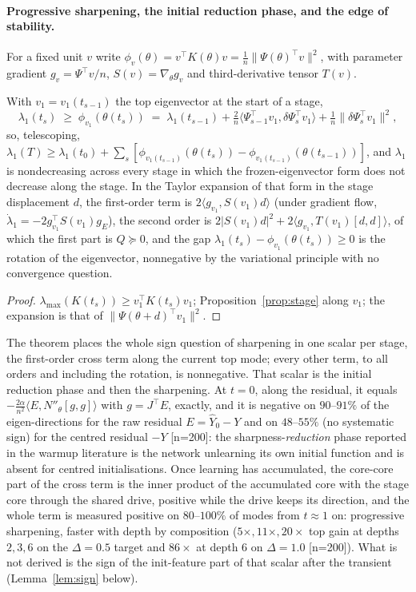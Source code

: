 \paragraph{Progressive sharpening, the initial reduction phase, and the edge of stability.}
For a fixed unit $v$ write $\phi_v(\theta)=v^{\!\top}K(\theta)v=\frac1n\|\Psi(\theta)^{\!\top}v\|^2$,
with parameter gradient $g_v=\Psi^{\!\top}v/n$, $S(v)=\nabla_\theta g_v$ and
third-derivative tensor $T(v)$.
\begin{theorem}
\label{thm:sharpening}
With $v_1=v_1(t_{s-1})$ the top eigenvector at the start of a stage,
\[
\lambda_1(t_s)\;\ge\;\phi_{v_1}(\theta(t_s))\;=\;\lambda_1(t_{s-1})+\tfrac2n\langle\Psi_{s-1}^{\!\top}v_1,\delta\Psi_s^{\!\top}v_1\rangle+\tfrac1n\|\delta\Psi_s^{\!\top}v_1\|^2 ,
\]
so, telescoping, $\lambda_1(T)\ge\lambda_1(t_0)+\sum_s[\phi_{v_1(t_{s-1})}(\theta(t_s))-\phi_{v_1(t_{s-1})}(\theta(t_{s-1}))]$,
and $\lambda_1$ is nondecreasing across every stage in which the
frozen-eigenvector form does not decrease along the stage. In the Taylor
expansion of that form in the stage displacement $d$, the first-order term is
$2\langle g_{v_1},S(v_1)d\rangle$ (under gradient flow,
$\dot\lambda_1=-2g_{v_1}^{\!\top}S(v_1)g_E$), the second order is
$2|S(v_1)d|^2+2\langle g_{v_1},T(v_1)[d,d]\rangle$, of which the first part is
$Q\succeq0$, and the gap $\lambda_1(t_s)-\phi_{v_1}(\theta(t_s))\ge0$ is the
rotation of the eigenvector, nonnegative by the variational principle with no
convergence question.
\end{theorem}
\begin{proof}
$\lambda_{\max}(K(t_s))\ge v_1^{\!\top}K(t_s)v_1$; Proposition~\ref{prop:stage}
along $v_1$; the expansion is that of $\|\Psi(\theta+d)^{\!\top}v_1\|^2$.
\end{proof}
The theorem places the whole sign question of sharpening in one scalar per
stage, the first-order cross term along the current top mode; every other
term, to all orders and including the rotation, is nonnegative. That scalar
is the initial reduction phase and then the sharpening. At $t=0$, along the
residual, it equals $-\frac{2\alpha}{n^2}\langle E,N''_{\theta}[g,g]\rangle$
with $g=J^{\!\top}E$, exactly, and it is negative on $90$--$91\%$ of the
eigen-directions for the raw residual $E=\hat Y_0-Y$ and on $48$--$55\%$ (no
systematic sign) for the centred residual $-Y$ [n=200]: the
sharpness-\emph{reduction} phase reported in the warmup literature is the
network unlearning its own initial function and is absent for centred
initialisations. Once learning has accumulated, the core-core part of the
cross term is the inner product of the accumulated core with the stage core
through the shared drive, positive while the drive keeps its direction, and
the whole term is measured positive on $80$--$100\%$ of modes from
$t\approx1$ on: progressive sharpening, faster with depth by composition
($5\times,11\times,20\times$ top gain at depths $2,3,6$ on the $\Delta=0.5$
target and $86\times$ at depth $6$ on $\Delta=1.0$ [n=200]). What is not
derived is the sign of the init-feature part of that scalar after the
transient (Lemma~\ref{lem:sign} below).

